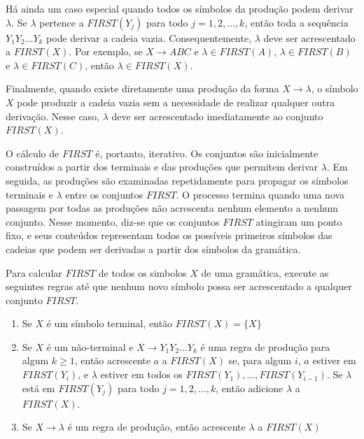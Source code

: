 \documentclass[
  brazilian,
  letterpaper,
]{book}
\theoremstyle{plain}
\theoremstyle{definition}
\theoremstyle{remark}
\begin{document}
Há ainda um caso especial quando todos os símbolos da produção podem
derivar \(\lambda\). Se \(\lambda\) pertence a \(FIRST(Y_j)\) para todo
\(j=1,2,\ldots,k\), então toda a sequência \(Y_1Y_2\ldots Y_k\) pode
derivar a cadeia vazia. Consequentemente, \(\lambda\) deve ser
acrescentado a \(FIRST(X)\). Por exemplo, se \(X\rightarrow ABC\) e
\(\lambda\in FIRST(A)\), \(\lambda\in FIRST(B)\) e
\(\lambda\in FIRST(C)\), então \(\lambda\in FIRST(X)\).

Finalmente, quando existe diretamente uma produção da forma
\(X\rightarrow\lambda\), o símbolo \(X\) pode produzir a cadeia vazia
sem a necessidade de realizar qualquer outra derivação. Nesse caso,
\(\lambda\) deve ser acrescentado imediatamente ao conjunto
\(FIRST(X)\).

O cálculo de \(FIRST\) é, portanto, iterativo. Os conjuntos são
inicialmente construídos a partir dos terminais e das produções que
permitem derivar \(\lambda\). Em seguida, as produções são examinadas
repetidamente para propagar os símbolos terminais e \(\lambda\) entre os
conjuntos \(FIRST\). O processo termina quando uma nova passagem por
todas as produções não acrescenta nenhum elemento a nenhum conjunto.
Nesse momento, diz-se que os conjuntos \(FIRST\) atingiram um ponto
fixo, e seus conteúdos representam todos os possíveis primeiros símbolos
das cadeias que podem ser derivadas a partir dos símbolos da gramática.

\begin{tcolorbox}[enhanced jigsaw, toptitle=1mm, rightrule=.15mm, title=\textcolor{quarto-callout-note-color}{\faInfo}\hspace{0.5em}{Resumo do Cálculo de FIRST}, toprule=.15mm, colback=white, left=2mm, arc=.35mm, opacitybacktitle=0.6, colframe=quarto-callout-note-color-frame, breakable, coltitle=black, titlerule=0mm, bottomtitle=1mm, leftrule=.75mm, bottomrule=.15mm, opacityback=0, colbacktitle=quarto-callout-note-color!10!white]

Para calcular \(FIRST\) de todos os simbolos \(X\) de uma gramática,
execute as seguintes regras até que nenhum novo símbolo possa ser
acrescentado a qualquer conjunto \(FIRST\).

\begin{enumerate}
\def\labelenumi{\arabic{enumi}.}
\item
  Se \(X\) é um símbolo terminal, então \(FIRST(X) = \{X\}\)
\item
  Se \(X\) é um não-terminal e \(X\rightarrow Y_1Y_2...Y_k\) é uma regra
  de produção para algum \(k \geq 1\), então acrescente \(a\) a
  \(FIRST(X)\) se, para algum \(i\), \(a\) estiver em \(FIRST(Y_i)\), e
  \(\lambda\) estiver em todos os \(FIRST(Y_1),...,FIRST(Y_{i-1})\). Se
  \(\lambda\) está em \(FIRST(Y_j)\) para todo \(j=1,2,...,k\), então
  adicione \(\lambda\) a \(FIRST(X)\).
\item
  Se \(X \rightarrow \lambda\) é um regra de produção, então acrescente
  \(\lambda\) a \(FIRST(X)\)
\end{enumerate}

\end{tcolorbox}
\end{document}
